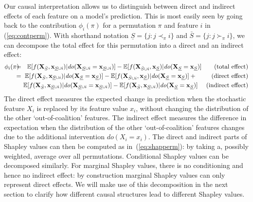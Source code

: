 \documentclass{article}
\newcommand{\vX}{\mathbf{X}}
\newcommand{\vx}{\mathbf{x}}
\newcommand{\expectation}{\mathbb{E}}
\newcommand{\contribution}{{\phi}}
\newcommand{\val}{{v}}
\newcommand{\dodo}{\mathit{do}}
\newcommand{\ldo}[1]{\dodo(X_{#1} = x_{#1})}
\newcommand{\lvdo}[1]{\dodo(\vX_{#1} = \vx_{#1})}
\newcommand{\perm}{\pi}
\newcommand{\isequal}{\hspace*{-2.5mm} & = & \hspace*{-2.5mm}}
\newcommand{\Spre}{\underline{S}}
\newcommand{\Spost}{\bar{S}}
\begin{document}
Our causal interpretation allows us to distinguish between direct and indirect effects of each feature on a model's prediction. This is most easily seen by going back to the contribution $\contribution_i(\perm)$ for a permutation $\perm$ and feature $i$ in (\ref{eq:contperm}).
With shorthand notation $\Spre = \{j: j \prec_\perm i\}$ and $\Spost = \{j: j \succ_\perm i\}$, we can decompose the total effect for this permutation into a direct and an indirect effect:
\begin{eqnarray*}
	\contribution_i(\perm) \isequal
	\expectation[f(\vX_{\Spost},\vx_{\Spre \cup i})|\lvdo{\Spre \cup i}] - \expectation[f(\vX_{\Spost \cup i},\vx_{\Spre})|\lvdo{\Spre}] ~~~~~~\mbox{(total effect)} \\
	\isequal \expectation[f(\vX_{\Spost},\vx_{\Spre \cup i})|\lvdo{\Spre}] - \expectation[f(\vX_{\Spost \cup i},\vx_{\Spre})|\lvdo{\Spre}] + ~~~~~~~\mbox{(direct effect)} \\
	&& \! \! \! \! \expectation[f(\vX_{\Spost},\vx_{\Spre \cup i})|\lvdo{\Spre \cup i}] - \expectation[f(\vX_{\Spost},\vx_{\Spre \cup i})|\lvdo{\Spre}] ~~~~\mbox{(indirect effect)}
\end{eqnarray*}
The direct effect measures the expected change in prediction when the stochastic feature $X_i$ is replaced by its feature value $x_i$, without changing the distribution of the other `out-of-coalition' features. The indirect effect measures the difference in expectation when the distribution of the other `out-of-coalition' features changes due to the additional intervention $\ldo{i}$. The direct and indirect parts of Shapley values can then be computed as in~(\ref{eq:shapperm}): by taking a, possibly weighted, average over all permutations. Conditional Shapley values can be decomposed similarly. For marginal Shapley values, there is no conditioning and hence no indirect effect: by construction marginal Shapley values can only represent direct effects. We will make use of this decomposition in the next section to clarify how different causal structures lead to different Shapley values.
\end{document}
